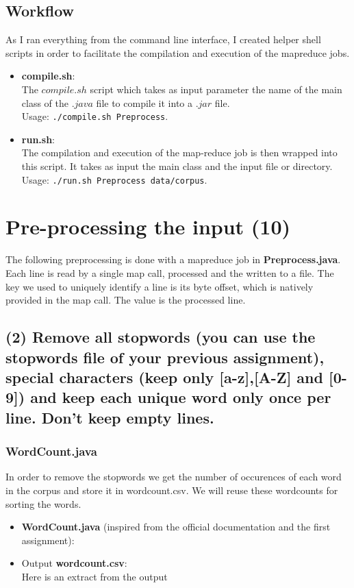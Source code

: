 \documentclass[a4paper,10pt]{article}
\begin{document}
\subsection{Workflow}
As I ran everything from the command line interface, I created helper shell scripts
in order to facilitate the compilation and execution of the mapreduce jobs.
\begin{itemize}

\item \textbf{compile.sh}:\\
The $compile.sh$ script which takes as input parameter the name of the main
class of the $.java$ file to compile it into a $.jar$ file.
\\Usage: \lstinline{./compile.sh Preprocess}.

\item \textbf{run.sh}:\\
The compilation and execution of the map-reduce job is then wrapped into this script.
It takes as input the main class and the input file or directory.
\\Usage: \lstinline{./run.sh Preprocess data/corpus}.



\end{itemize}

\section{Pre-processing the input (10)}

The following preprocessing is done with a mapreduce job in \textbf{Preprocess.java}.
Each line is read by a single map call, processed and the written to a file.
The key we used to uniquely identify a line is its byte offset, which is natively
provided in the map call.
The value is the processed line.

\subsection{(2) Remove all stopwords (you can use the stopwords file of your previous
assignment), special characters (keep only [a-z],[A-Z] and [0-9]) and keep each unique
word only once per line. Don’t keep empty lines.}
\subsubsection{WordCount.java}
In order to remove the stopwords we get the number of occurences of each word in
the corpus and store it in wordcount.csv.
We will reuse these wordcounts for sorting the words.
\begin{itemize}
  \item \textbf{WordCount.java} (inspired from the official documentation and the first assignment):
  
  \item Output \textbf{wordcount.csv}:\\
  Here is an extract from the output
  
\end{itemize}
\end{document}
